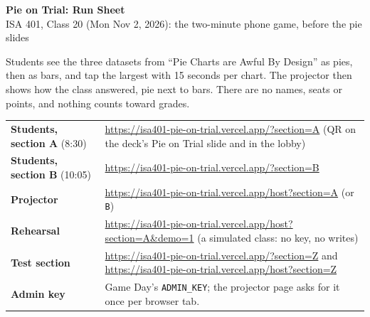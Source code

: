 \documentclass[10pt,letterpaper]{article}
\newcommand{\site}{isa401-pie-on-trial.vercel.app}
\begin{document}
\begin{center}
	{\LARGE\bfseries Pie on Trial: Run Sheet}\\[2pt]
	{\large ISA 401, Class 20 (Mon Nov 2, 2026): the two-minute phone game, before the pie slides}
\end{center}

\vspace{-2pt}
Students see the three datasets from ``Pie Charts are Awful By Design'' as pies, then as bars, and tap the largest with 15 seconds per chart. The projector then shows how the class answered, pie next to bars. There are no names, seats or points, and nothing counts toward grades.

\medskip
\begin{tabularx}{\textwidth}{@{}lX@{}}
	\hline
	\textbf{Students, section A} (8:30) & \url{https://\site/?section=A} \quad (QR on the deck's Pie on Trial slide and in the lobby) \\
	\textbf{Students, section B} (10:05) & \url{https://\site/?section=B} \\
	\textbf{Projector} & \url{https://\site/host?section=A} \quad (or \texttt{B}) \\
	\textbf{Rehearsal} & \url{https://\site/host?section=A&demo=1} \quad (a simulated class: no key, no writes) \\
	\textbf{Test section} & \url{https://\site/?section=Z} \quad and \quad \url{https://\site/host?section=Z} \\
	\textbf{Admin key} & Game Day's \texttt{ADMIN\_KEY}; the projector page asks for it once per browser tab. \\
	\hline
\end{tabularx}
\end{document}

